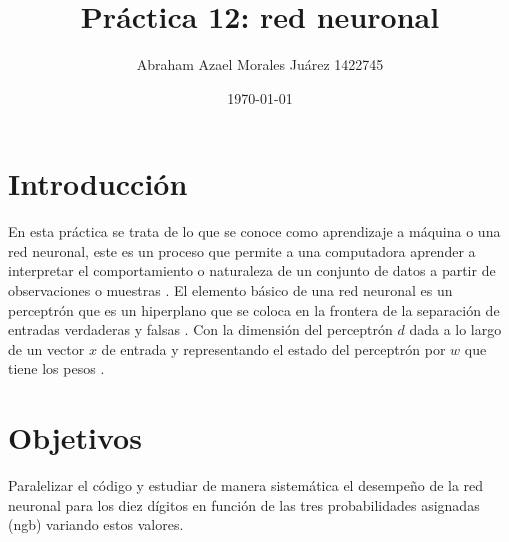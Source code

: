 \documentclass{article}
\author{Abraham Azael Morales Juárez  1422745}
\title{Práctica 12: red neuronal}
\date{\today}
\begin{document}
\maketitle

\section{Introducción}
En esta práctica se trata de lo que se conoce como aprendizaje a máquina o una red neuronal, este es un proceso que permite a una computadora aprender a interpretar el comportamiento o naturaleza de un conjunto de datos a partir de observaciones o muestras \cite{REF2}. El elemento básico de una red neuronal es un perceptrón que es un hiperplano que se coloca en la frontera de la separación de entradas verdaderas y falsas \cite{REF1}.
Con la dimensión del perceptrón $d$ dada a lo largo de un vector $x$ de entrada y representando el estado del perceptrón por $w$ que tiene los pesos \cite{REF1}.
\section{Objetivos}
Paralelizar el código y estudiar de manera sistemática el desempeño de la red neuronal para los diez dígitos en función de las tres probabilidades asignadas (ngb) variando estos valores.
\end{document}

